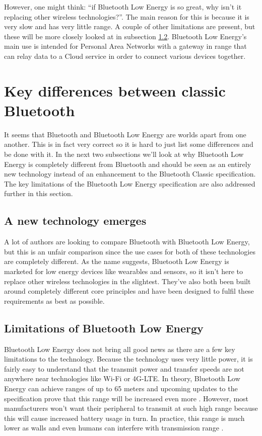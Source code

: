 \documentclass[pdftex,a4paper,12pt,twoside]{report}
\begin{document}
However, one might think: ``if Bluetooth Low Energy is so great, why isn't it replacing other wireless technologies?''. The main reason for this is because it is very slow and has very little range. A couple of other limitations are present, but these will be more closely looked at in subsection \ref{subsec:limitations}. Bluetooth Low Energy's main use is intended for Personal Area Networks with a gateway in range that can relay data to a Cloud service in order to connect various devices together.

\section{Key differences between classic Bluetooth}
\label{sec:differencesclassic}
It seems that Bluetooth and Bluetooth Low Energy are worlds apart from one another. This is in fact very correct so it is hard to just list some differences and be done with it. In the next two subsections we'll look at why Bluetooth Low Energy is completely different from Bluetooth and should be seen as an entirely new technology instead of an enhancement to the Bluetooth Classic specification. The key limitations of the Bluetooth Low Energy specification are also addressed further in this section.

\subsection{A new technology emerges}
\label{subsec:newtechnology}
A lot of authors are looking to compare Bluetooth with Bluetooth Low Energy, but this is an unfair comparison since the use cases for both of these technologies are completely different. As the name suggests, Bluetooth Low Energy is marketed for low energy devices like wearables and sensors, so it isn't here to replace other wireless technologies in the slightest. They've also both been built around completely different core principles and have been designed to fulfil these requirements as best as possible.

\subsection{Limitations of Bluetooth Low Energy}
\label{subsec:limitations}
Bluetooth Low Energy does not bring all good news as there are a few key limitations to the technology. Because the technology uses very little power, it is fairly easy to understand that the transmit power and transfer speeds are not anywhere near technologies like Wi-Fi or 4G-LTE. In theory, Bluetooth Low Energy can achieve ranges of up to 65 meters and upcoming updates to the specification prove that this range will be increased even more \citep{heydon2012bluetooth}. However, most manufacturers won't want their peripheral to transmit at such high range because this will cause increased battery usage in turn. In practice, this range is much lower as walls and even humans can interfere with transmission range \citep{faragher2014analysis}.
\end{document}

